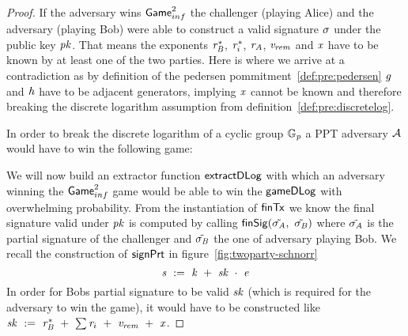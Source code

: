 \begin{proof}
    If the adversary wins $\mathsf{Game}_{inf}^{2}$ the challenger (playing Alice) and the adversary (playing Bob) were able to construct a valid signature $\sigma$ under the public key $\mathit{pk}$.
    That means the exponents $\mathit{r}_{\mathit{B}}^*$, $\mathit{r}_i^*$, $\mathit{r}_{\mathit{A}}$, $\mathit{v_{rem}}$ and $\mathit{x}$ have to be known by at least one of the two parties.
    Here is where we arrive at a contradiction as by definition of the pedersen pommitment~\ref{def:pre:pedersen} $\mathit{g}$ and $\mathit{h}$ have to be adjacent generators, implying $\mathit{x}$ cannot be known and therefore breaking the discrete logarithm assumption from definition~\ref{def:pre:discretelog}.


    In order to break the discrete logarithm of a cyclic group $\mathbb{G}_{\mathit{p}}$ a PPT adversary $\mathcal{A}$ would have to win the following game:
    \begin{center}
        \fbox{
        \begin{varwidth}{\textwidth}
            \procedure[linenumbering]{$\procDiscreteLogGame{\varPrime}$} {
            \varG \sample \cnstGroup_\varPrime \\
            \varX \sample \cnstIntegersPrimeWithoutZero{\varPrime} \\
            \varPubKey \opFunResult \funGen{\varX} \\
            \funStar{\varX} \opFunResult \cnstAdversary (\varPubKey) \\
            \pcreturn \varPubKey \opEqNoQ \funGen{\funStar{\varX}}
            }
        \end{varwidth}
        }
    \end{center}
    We will now build an extractor function $\mathsf{extractDLog}$ with which an adversary winning the $\mathsf{Game}_{inf}^{2}$ game would be able to win the $\mathsf{gameDLog}$ with overwhelming probability.
    From the instantiation of $\mathsf{finTx}$ we know the final signature valid under $\mathit{pk}$ is computed by calling $\mathsf{finSig}(\tilde{\sigma_{\mathit{A}}} ,~ \tilde{\sigma_{\mathit{B}}})$ where $\tilde{\sigma_{\mathit{A}}}$ is the partial signature of the challenger and $\tilde{\sigma_{\mathit{B}}}$ the one of adversary playing Bob.
    We recall the construction of $\mathsf{signPrt}$ in figure~\ref{fig:twoparty-schnorr}
    \[ \mathit{s} ~:=~ \mathit{k} ~+~ \mathit{sk} ~\cdot~ \mathit{e} \\ \]
    In order for Bobs partial signature to be valid $\mathit{sk}$ (which is required for the adversary to win the game), it would have to be constructed like $\mathit{sk} ~:=~ \mathit{r}_{\mathit{B}}^* ~+~ \sum \mathit{r}_i ~+~ \mathit{v_{rem}} ~+~ \mathit{x}$.

\end{proof}
